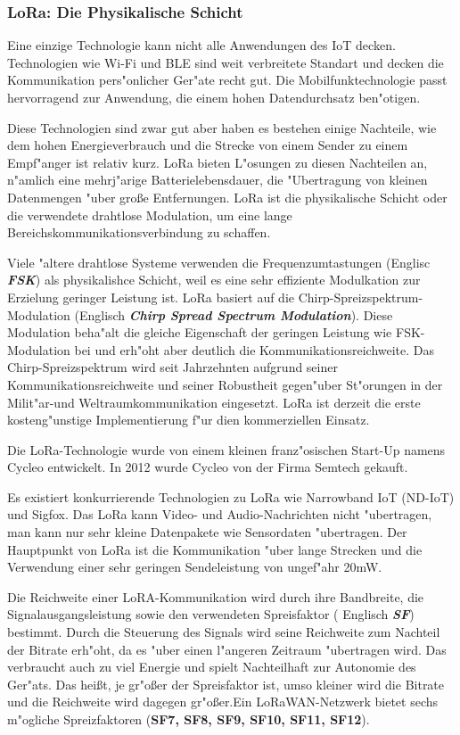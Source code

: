 \subsubsection{LoRa: Die Physikalische Schicht}

Eine einzige Technologie kann nicht alle Anwendungen des IoT 
decken. Technologien wie Wi-Fi und \ac{BLE} sind weit 
verbreitete Standart und decken die Kommunikation pers"onlicher 
Ger"ate recht gut. Die Mobilfunktechnologie passt hervorragend zur 
Anwendung, die einem hohen Datendurchsatz ben"otigen.

Diese Technologien sind zwar gut aber haben es bestehen einige 
Nachteile, wie dem hohen Energieverbrauch und die Strecke von einem 
Sender zu einem Empf"anger ist relativ kurz. LoRa bieten L"osungen zu 
diesen Nachteilen an, n"amlich eine mehrj"arige Batterielebensdauer, 
die "Ubertragung von kleinen Datenmengen "uber gro\ss{}e Entfernungen. 
LoRa ist die physikalische Schicht oder die verwendete drahtlose 
Modulation, um eine lange Bereichskommunikationsverbindung zu 
schaffen. 

Viele "altere drahtlose Systeme verwenden die Frequenzumtastungen
(Englisc \textbf{\textit{\ac{FSK}}}) als physikalishce Schicht, weil es eine sehr 
effiziente Modulkation zur Erzielung geringer Leistung ist. LoRa 
basiert auf die Chirp-Spreizspektrum-Modulation (Englisch 
\textbf{\textit{Chirp Spread Spectrum Modulation}}). Diese Modulation 
beha"alt die gleiche Eigenschaft der geringen Leistung wie 
\ac{FSK}-Modulation bei und erh"oht aber deutlich die 
Kommunikationsreichweite. Das Chirp-Spreizspektrum wird seit 
Jahrzehnten aufgrund seiner Kommunikationsreichweite und seiner 
Robustheit gegen"uber St"orungen in der Milit"ar-und 
Weltraumkommunikation eingesetzt. LoRa ist derzeit die erste 
kosteng"unstige Implementierung f"ur dien kommerziellen Einsatz.

Die LoRa-Technologie wurde von einem kleinen franz"osischen Start-Up 
namens Cycleo entwickelt. In 2012 wurde Cycleo von der Firma Semtech 
gekauft.

Es existiert konkurrierende Technologien zu LoRa  wie Narrowband IoT 
(ND-IoT) und Sigfox. Das LoRa kann  Video- und Audio-Nachrichten nicht 
"ubertragen, man kann nur sehr kleine Datenpakete wie Sensordaten 
"ubertragen. Der Hauptpunkt von LoRa ist die Kommunikation "uber lange 
Strecken und die Verwendung einer sehr geringen Sendeleistung von 
ungef"ahr 20mW. 

Die Reichweite einer LoRA-Kommunikation wird durch ihre Bandbreite, die 
Signalausgangsleistung sowie den verwendeten Spreisfaktor ( Englisch 
\textbf{\textit{\ac{SF}}}) bestimmt. Durch die Steuerung des Signals 
wird seine Reichweite zum Nachteil der Bitrate erh"oht, da es "uber 
einen l"angeren Zeitraum "ubertragen wird. Das verbraucht auch zu viel 
Energie und spielt Nachteilhaft zur Autonomie des Ger"ats. Das hei\ss{}t, 
je gr"o\ss{}er der Spreisfaktor ist, umso kleiner wird die Bitrate und 
die Reichweite wird dagegen gr"o\ss{}er.Ein LoRaWAN-Netzwerk bietet 
sechs m"ogliche Spreizfaktoren (\textbf{SF7, SF8, SF9, SF10, SF11, 
SF12}).  

